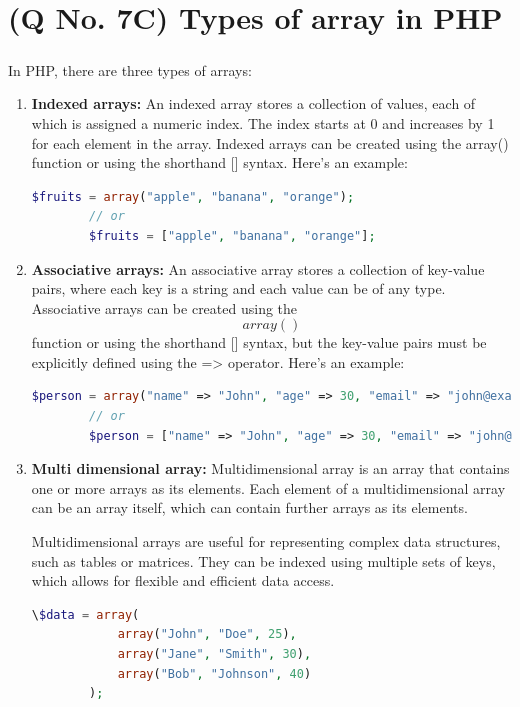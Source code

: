 \documentclass[11pt]{article}
\begin{document}
\section{(Q No. 7C) Types of array in PHP}
\subparagraph{}
In PHP, there are three types of arrays:
\begin{enumerate}
    \item \textbf{Indexed arrays:}
    An indexed array stores a collection of values, each of which is assigned a numeric index. The index starts at 0 and increases by 1 for each element in the array. Indexed arrays can be created using the array() function or using the shorthand [] syntax. Here's an example:
    \begin{lstlisting}[language=php]
        $fruits = array("apple", "banana", "orange");
        // or
        $fruits = ["apple", "banana", "orange"];
    \end{lstlisting}

    \item \textbf{Associative arrays:}
    An associative array stores a collection of key-value pairs, where each key is a string and each value can be of any type. Associative arrays can be created using the \[array()\] function or using the shorthand [] syntax, but the key-value pairs must be explicitly defined using the => operator. Here's an example:
    \begin{lstlisting}[language=php]
        $person = array("name" => "John", "age" => 30, "email" => "john@example.com");
        // or
        $person = ["name" => "John", "age" => 30, "email" => "john@example.com"];

    \end{lstlisting}

    \item \textbf{Multi dimensional array:}
    Multidimensional array is an array that contains one or more arrays as its elements. Each element of a multidimensional array can be an array itself, which can contain further arrays as its elements.

    Multidimensional arrays are useful for representing complex data structures, such as tables or matrices. They can be indexed using multiple sets of keys, which allows for flexible and efficient data access.
    \begin{lstlisting}[language=php]
        \$data = array(
            array("John", "Doe", 25),
            array("Jane", "Smith", 30),
            array("Bob", "Johnson", 40)
        );
    \end{lstlisting}
\end{enumerate}

\end{document}
